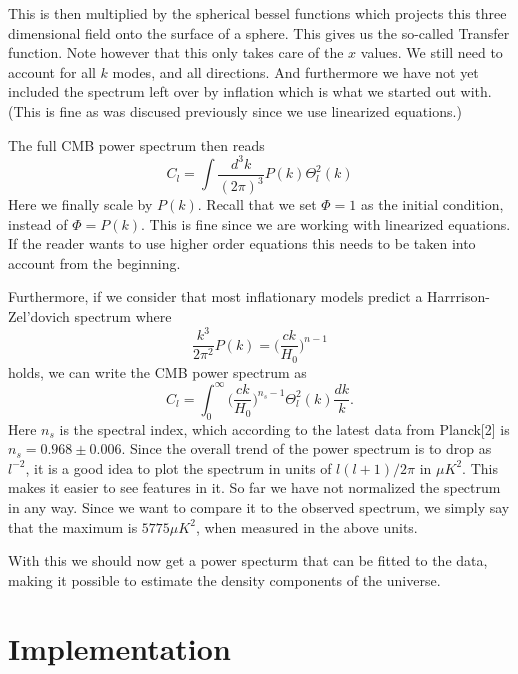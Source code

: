 \documentclass[a4paper]{report}
\begin{document}
This is then multiplied by the spherical bessel functions which projects this three dimensional field onto the surface of a sphere. This gives us the so-called Transfer function. Note however that this only takes care of the $x$ values. We still need to account for all $k$ modes, and all directions. And furthermore we have not yet included the spectrum left over by inflation which is what we started out with. (This is fine as was discused previously since we use linearized equations.)

The full CMB power spectrum then reads 
\begin{equation}
 C_l = \int\frac{d^3k}{(2\pi)^3}P(k)\Theta_l^2(k)
\end{equation}
Here we finally scale by $P(k)$. Recall that we set $\Phi = 1$ as the initial condition, instead of $\Phi = P(k)$. This is fine since we are working with linearized equations. If the reader wants to use higher order equations this needs to be taken into account from the beginning.

Furthermore, if we consider that most inflationary models predict a Harrrison-Zel'dovich spectrum where 
\begin{equation}
 \frac{k^3}{2\pi^2}P(k) = \bigg(\frac{ck}{H_0}\bigg)^{n-1}
\end{equation}
holds, we can write the CMB power spectrum as
\begin{equation}
  C_l = \int_0^\infty\bigg(\frac{ck}{H_0}\bigg)^{n_s-1}\Theta_l^2(k)\frac{dk}{k}.
\end{equation}
Here $n_s$ is the spectral index, which according to the latest data from Planck[2] is $n_s = 0.968\pm0.006$.
Since the overall trend of the power spectrum is to drop as $l^{-2}$, it is a good idea to plot the spectrum in units of $l(l+1)/2\pi$ in $\mu K^2$. This makes it easier to see features in it. So far we have not normalized the spectrum in any way. Since we want to compare it to the observed spectrum, we simply say that the maximum is $5775\mu K^2$, when measured in the above units.

With this we should now get a power specturm that can be fitted to the data, making it possible to estimate the density components of the universe.

\section{Implementation}\label{sec:Imp}
\end{document}
